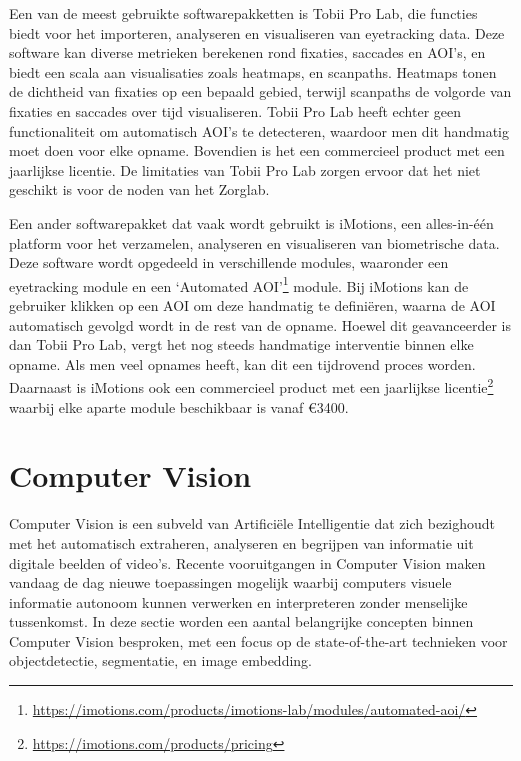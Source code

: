 Een van de meest gebruikte softwarepakketten is Tobii Pro Lab, die functies biedt voor het importeren, analyseren en visualiseren van eyetracking data.
Deze software kan diverse metrieken \autocite{tobii_pro_lab_metrics} berekenen rond fixaties, 
saccades en AOI's, en biedt een scala aan visualisaties \autocite{tobii_pro_lab_visualizations} zoals heatmaps, en scanpaths.
Heatmaps tonen de dichtheid van fixaties op een bepaald gebied, terwijl scanpaths de volgorde van fixaties en saccades over tijd visualiseren.
Tobii Pro Lab heeft echter geen functionaliteit om automatisch AOI's te detecteren, waardoor men dit handmatig moet doen voor elke opname.
Bovendien is het een commercieel product met een jaarlijkse licentie.
De limitaties van Tobii Pro Lab zorgen ervoor dat het niet geschikt is voor de noden van het Zorglab.

Een ander softwarepakket dat vaak wordt gebruikt is iMotions, een alles-in-één platform voor het verzamelen, analyseren en visualiseren van biometrische data.
Deze software wordt opgedeeld in verschillende modules, waaronder een eyetracking module en een `Automated AOI'\footnote{\url{https://imotions.com/products/imotions-lab/modules/automated-aoi/}} module.
Bij iMotions kan de gebruiker klikken op een AOI om deze handmatig te definiëren, waarna de AOI automatisch gevolgd wordt in de rest van de opname.
Hoewel dit geavanceerder is dan Tobii Pro Lab, vergt het nog steeds handmatige interventie binnen elke opname. Als men veel opnames heeft, kan dit een tijdrovend proces worden.
Daarnaast is iMotions ook een commercieel product met een jaarlijkse licentie\footnote{\url{https://imotions.com/products/pricing}} waarbij elke aparte module beschikbaar is vanaf €3400.

\section{Computer Vision}

Computer Vision is een subveld van Artificiële Intelligentie dat zich bezighoudt met het automatisch extraheren, analyseren en begrijpen van informatie uit digitale beelden of video's.
Recente vooruitgangen in Computer Vision maken vandaag de dag nieuwe toepassingen mogelijk waarbij computers visuele informatie autonoom kunnen verwerken en interpreteren zonder menselijke tussenkomst.
In deze sectie worden een aantal belangrijke concepten binnen Computer Vision besproken, met een focus op de state-of-the-art technieken voor objectdetectie, segmentatie, en image embedding.

